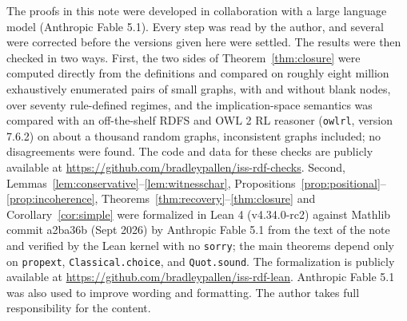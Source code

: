 \documentclass[12pt]{article}
\theoremstyle{definition}
\begin{document}
The proofs in this note were developed in collaboration with a large language model (Anthropic Fable 5.1). Every step was read by the author, and several were corrected before the versions given here were settled. The results were then checked in two ways. First, the two sides of Theorem~\ref{thm:closure} were computed directly from the definitions and compared on roughly eight million exhaustively enumerated pairs of small graphs, with and without blank nodes, over seventy rule-defined regimes, and the implication-space semantics was compared with an off-the-shelf RDFS and OWL 2 RL reasoner (\texttt{owlrl}, version 7.6.2) on about a thousand random graphs, inconsistent graphs included; no disagreements were found. The code and data for these checks are publicly available at \url{https://github.com/bradleypallen/iss-rdf-checks}. Second, Lemmas~\ref{lem:conservative}--\ref{lem:witnesschar}, Propositions~\ref{prop:positional}--\ref{prop:incoherence}, Theorems~\ref{thm:recovery}--\ref{thm:closure} and Corollary~\ref{cor:simple} were formalized in Lean 4 (v4.34.0-rc2) against Mathlib commit a2ba36b (Sept 2026) by Anthropic Fable 5.1 from the text of the note and verified by the Lean kernel with no \texttt{sorry}; the main theorems depend only on \texttt{propext}, \texttt{Classical.choice}, and \texttt{Quot.sound}. The formalization is publicly available at \url{https://github.com/bradleypallen/iss-rdf-lean}. Anthropic Fable 5.1 was also used to improve wording and formatting. The author takes full responsibility for the content. 



\end{document}
